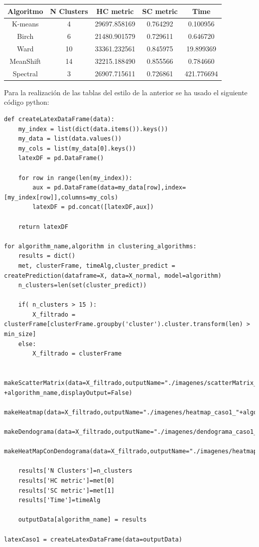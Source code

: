 	\begin{table}[htbp]
		\begin{center}
			\begin{tabular}{c | c | c | c | c}
				\toprule
				Algoritmo &  N Clusters &     HC metric &  SC metric &        Time \\
				\midrule
				K-means   &           4 &  29697.858169 &   0.764292 &    0.100956 \\
				Birch     &           6 &  21480.901579 &   0.729611 &    0.646720 \\
				Ward      &          10 &  33361.232561 &   0.845975 &   19.899369 \\
				MeanShift &          14 &  32215.188490 &   0.855566 &    0.784660 \\
				Spectral  &           3 &  26907.715611 &   0.726861 &  421.776694 \\
				\bottomrule
			\end{tabular}
		\end{center}
	\end{table}

	Para la realización de las tablas del estilo de la anterior se ha usado el siguiente código python: \\

	\lstset{language=python}
	\begin{lstlisting}[frame=single]
def createLatexDataFrame(data):
	my_index = list(dict(data.items()).keys())
	my_data = list(data.values())
	my_cols = list(my_data[0].keys())
	latexDF = pd.DataFrame()

	for row in range(len(my_index)):
		aux = pd.DataFrame(data=my_data[row],index=[my_index[row]],columns=my_cols)
		latexDF = pd.concat([latexDF,aux])

	return latexDF

for algorithm_name,algorithm in clustering_algorithms:
    results = dict()
    met, clusterFrame, timeAlg,cluster_predict = createPrediction(dataframe=X, data=X_normal, model=algorithm)
    n_clusters=len(set(cluster_predict))

    if( n_clusters > 15 ):
        X_filtrado = clusterFrame[clusterFrame.groupby('cluster').cluster.transform(len) > min_size]
    else:
        X_filtrado = clusterFrame

    makeScatterMatrix(data=X_filtrado,outputName="./imagenes/scatterMatrix_caso1_" +algorithm_name,displayOutput=False)
    makeHeatmap(data=X_filtrado,outputName="./imagenes/heatmap_caso1_"+algorithm_name,displayOutput=False)
    makeDendograma(data=X_filtrado,outputName="./imagenes/dendograma_caso1_"+algorithm_name,displayOutput=False)
    makeHeatMapConDendograma(data=X_filtrado,outputName="./imagenes/heatmapcondendograma_caso1_"+algorithm_name,displayOutput=False)
    
    results['N Clusters']=n_clusters
    results['HC metric']=met[0]
    results['SC metric']=met[1]
    results['Time']=timeAlg

    outputData[algorithm_name] = results

latexCaso1 = createLatexDataFrame(data=outputData)
	\end{lstlisting}

